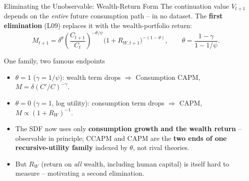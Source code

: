 \documentclass{beamer}
\begin{document}
\begin{frame}{Eliminating the Unobservable: Wealth-Return Form}
The continuation value $V_{t+1}$ depends on the \textit{entire} future consumption path -- in no dataset. The \textbf{first elimination} (L09) replaces it with the wealth-portfolio return:
\begin{equation*}
  M_{t+1}=\delta^{\theta}\left(\frac{C_{t+1}}{C_t}\right)^{-\theta/\psi}\big(1+R_{W,t+1}\big)^{-(1-\theta)},
  \qquad \theta=\frac{1-\gamma}{1-1/\psi}.
\end{equation*}
\begin{block}{One family, two famous endpoints}
\begin{itemize}
  \item $\theta=1$ ($\gamma=1/\psi$): wealth term drops $\Rightarrow$ \alert{Consumption CAPM}, $M=\delta(C'/C)^{-\gamma}$.
  \item $\theta=0$ ($\gamma=1$, log utility): consumption term drops $\Rightarrow$ \alert{CAPM}, $M\propto(1+R_W)^{-1}$.
\end{itemize}
\end{block}
\begin{itemize}
  \item The SDF now uses only \textbf{consumption growth and the wealth return} -- observable in principle; CCAPM and CAPM are the \textbf{two ends of one recursive-utility family} indexed by $\theta$, not rival theories.
  \item But $R_W$ (return on \textit{all} wealth, including human capital) is itself hard to measure -- motivating a second elimination.
\end{itemize}
\end{frame}
\end{document}
